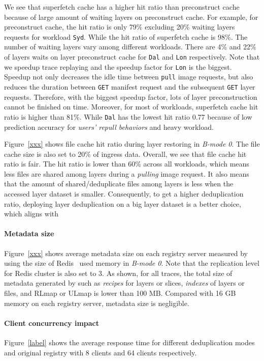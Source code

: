 We see that superfetch cache has a higher hit ratio than preconstruct cache
because of large amount of waiting layers on preconstruct cache.
For example, for preconstruct cache, 
the hit ratio is only 79\% excluding 20\% waiting layers requests for workload \texttt{Syd}.
While the hit ratio of superfetch cache is 98\%.
The number of waiting layers vary among different workloads.
There are 4\% and 22\% of 
layers waits on layer preconstruct cache for \texttt{Dal} and \texttt{Lon} respectively. 
Note that we speedup trace replaying
and the speedup factor for \texttt{Lon} is the biggest.
Speedup not only decreases the idle time between \texttt{pull} image requests,
but also reduces the duration between \texttt{GET} manifest request 
and the subsequent \texttt{GET} layer requests.
Therefore, with the biggest speedup factor,
lots of layer preconstruction cannot be finished on time.
Moreover,
for most of workloads,
superfetch cache hit ratio is higher than 81\%.
While \texttt{Dal} has the lowest hit ratio 0.77 
because of 
low prediction accuracy for \emph{users' repull behaviors} 
and heavy workload.

Figure~\ref{xxx} shows file cache hit ratio during layer restoring in \emph{B-mode 0}.
The file cache size is also set to 20\% of ingress data.
Overall, we see that file cache hit ratio is fair.
The hit ratio is lower than 60\% across all workloads,
which means less files are shared among layers during a \emph{pulling} image request.
It also means that the amount of shared/deduplicate files among layers is less when 
the accessed layer dataset is smaller.
Consequently,
to get a higher deduplication ratio,
deploying layer deduplication on a big layer dataset is a better choice, which aligns with
~\cite{dedupanalysis}


\paragraph{Metadata size} 
Figure~\ref{xxx} shows
average metadata size on each registry server measured by using the size of Redis~\cite{redis} used memory in \emph{B-mode 0}.
Note that the replication level for Redis cluster is also set to 3.
As shown,
for all traces,
the total size of metadata generated by \sysname such as \emph{recipes} for layers or slices, \emph{indexes} of layers or files, 
and RLmap or ULmap
is lower than 100 MB.
Compared with 16 GB memory on each registry server,
metadata size is negligible.

\paragraph{Client concurrency impact}
Figure~\ref{label} shows the average response time for different deduplication modes and original registry
with 8 clients and 64 clients respectively.

